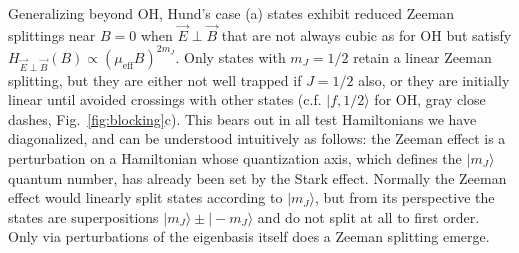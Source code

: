 \documentclass[%
 reprint,
 amsmath,amssymb,
 aps,
prl,
]{revtex4-1}
\newcommand{\epb}{{$\vec{E}\!\perp\!\vec{B}$}}
\newcommand{\epbm}{{\vec{E}\!\perp\!\vec{B}}}
\begin{document}


Generalizing beyond OH, Hund's case (a) states exhibit reduced Zeeman splittings near $B\!=\!0$ when \epb{} that are not always cubic as for OH but satisfy $H_\epbm(B)\propto (\mu_\text{eff}B)^{2m_J}$. Only states with $m_J=1/2$ retain a linear Zeeman splitting, but they are either not well trapped if $J=1/2$ also, or they are initially linear until avoided crossings with other states (c.f. $|f,1/2\rangle$ for OH, gray close dashes, Fig.~\ref{fig:blocking}c). This bears out in all test Hamiltonians we have diagonalized, and can be understood intuitively as follows: the Zeeman effect is a perturbation on a Hamiltonian whose quantization axis, which defines the $|m_J\rangle$ quantum number, has already been set by the Stark effect. Normally the Zeeman effect would linearly split states according to $|m_J\rangle$, but from its perspective the states are superpositions $|m_J\rangle\pm|\!-\!m_J\rangle$ and do not split at all to first order. Only via perturbations of the eigenbasis itself does a Zeeman splitting emerge.



%
\end{document}

